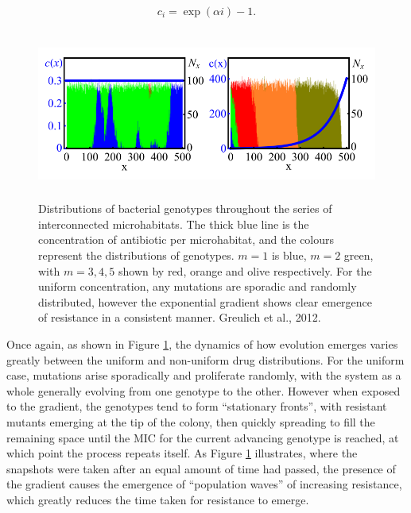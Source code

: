 \documentclass[a4paper,12pt]{article}
\begin{document}
\begin{equation}
 c_i = \exp(\alpha{i}) - 1.
 \label{eqn:c_i}
\end{equation}


\begin{figure}[H]
 \centering
 \includegraphics[height=5.6cm]{greulich-geno-distbs}
 \caption{Distributions of bacterial genotypes throughout the series of interconnected microhabitats.  The thick blue line is the concentration of antibiotic per 
 microhabitat, and the colours represent the distributions of genotypes.  $m=1$ is blue, $m=2$ green, with $m=3, 4, 5$ shown by red, orange and olive respectively.  
 For the uniform concentration, any mutations are sporadic and randomly  distributed, however the exponential gradient shows clear emergence of resistance in a 
 consistent manner.  Greulich et al., 2012.}
 \label{fig:Greulich-geno-distbs}
\end{figure}

Once again, as shown in Figure \ref{fig:Greulich-geno-distbs}, the dynamics of how evolution emerges varies greatly between the uniform and non-uniform drug distributions.  
For the uniform case, mutations arise sporadically and proliferate randomly, with the system as a whole generally evolving from one genotype to the other.  However when 
exposed to the gradient, the genotypes tend to form ``stationary fronts'', with resistant mutants emerging at the tip of the colony, then quickly spreading to fill
the remaining space until the MIC for the current advancing genotype is reached, at which point the process repeats itself.  As Figure \ref{fig:Greulich-geno-distbs} 
illustrates, where the snapshots were taken after an equal amount of time had passed, the presence of the gradient causes the emergence of ``population waves'' of increasing 
resistance, which greatly reduces the time taken for resistance to emerge.
\end{document}
